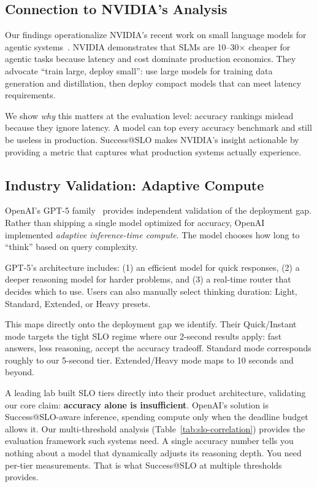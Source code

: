 \documentclass[11pt]{article}
\begin{document}
\subsection{Connection to NVIDIA's Analysis}

Our findings operationalize NVIDIA's recent work on small language models for agentic systems~\citep{nvidia2025slm}.
NVIDIA demonstrates that SLMs are 10--30$\times$ cheaper for agentic tasks because latency and cost dominate production economics.
They advocate ``train large, deploy small'': use large models for training data generation and distillation, then deploy compact models that can meet latency requirements.

We show \emph{why} this matters at the evaluation level: accuracy rankings mislead because they ignore latency.
A model can top every accuracy benchmark and still be useless in production.
Success@SLO makes NVIDIA's insight actionable by providing a metric that captures what production systems actually experience.

\subsection{Industry Validation: Adaptive Compute}

OpenAI's GPT-5 family~\citep{openai2025gpt5} provides independent validation of the deployment gap.
Rather than shipping a single model optimized for accuracy, OpenAI implemented \emph{adaptive inference-time compute}.  The model chooses how long to ``think'' based on query complexity.

GPT-5's architecture includes: (1) an efficient model for quick responses, (2) a deeper reasoning model for harder problems, and (3) a real-time router that decides which to use.
Users can also manually select thinking duration: Light, Standard, Extended, or Heavy presets.

This maps directly onto the deployment gap we identify.  Their Quick/Instant mode targets the tight SLO regime where our 2-second results apply: fast answers, less reasoning, accept the accuracy tradeoff.  Standard mode corresponds roughly to our 5-second tier.  Extended/Heavy mode maps to 10 seconds and beyond.

A leading lab built SLO tiers directly into their product architecture, validating our core claim: \textbf{accuracy alone is insufficient}.  OpenAI's solution is Success@SLO-aware inference, spending compute only when the deadline budget allows it.  Our multi-threshold analysis (Table~\ref{tab:slo-correlation}) provides the evaluation framework such systems need.  A single accuracy number tells you nothing about a model that dynamically adjusts its reasoning depth.  You need per-tier measurements.  That is what Success@SLO at multiple thresholds provides.
\end{document}
